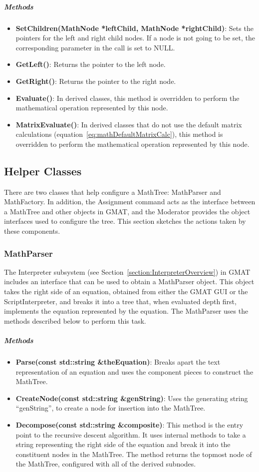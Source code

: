 \subparagraph{\textit{Methods}}
\begin{itemize}
\item \textbf{SetChildren(MathNode *leftChild, MathNode *rightChild)}: Sets the pointers for the
left and right child nodes.  If a node is not going to be set, the corresponding parameter in the
call is set to NULL.
\item \textbf{GetLeft()}: Returns the pointer to the left node.
\item \textbf{GetRight()}: Returns the pointer to the right node.
\item \textbf{Evaluate()}: In derived classes, this method is overridden to perform the mathematical
operation represented by this node.
\item \textbf{MatrixEvaluate()}: In derived classes that do not use the default matrix calculations
(equation~\ref{eq:mathDefaultMatrixCalc}), this method is overridden to perform the mathematical
operation represented by this node.
\end{itemize}

\subsection{Helper Classes}

There are two classes that help configure a MathTree: MathParser and MathFactory.  In addition, the
Assignment command acts as the interface between a MathTree and other objects in GMAT, and the
Moderator provides the object interfaces used to configure the tree.  This section sketches the
actions taken by these components.

\subsubsection{MathParser}

The Interpreter subsystem (see Section~\ref{section:InterpreterOverview}) in GMAT includes an
interface that can be used to obtain a MathParser object.  This object takes the right side of an
equation, obtained from either the GMAT GUI or the ScriptInterpreter, and breaks it into a tree
that, when evaluated depth first, implements the equation represented by the equation.  The
MathParser uses the methods described below to perform this task.

\subparagraph{\textit{Methods}}
\begin{itemize}
\item \textbf{Parse(const std::string \&theEquation)}: Breaks apart the text representation of an
equation and uses the component pieces to construct the MathTree.
\item \textbf{CreateNode(const std::string \&genString)}: Uses the generating string ``genString'',
to create a node for insertion into the MathTree.
\item \textbf{Decompose(const std::string \&composite)}: This method is the entry point to the
recursive descent algorithm.  It uses internal methods to take a string representing the right side
of the equation and break it into the constituent nodes in the MathTree.  The method returns the
topmost node of the MathTree, configured with all of the derived subnodes.
\end{itemize}


